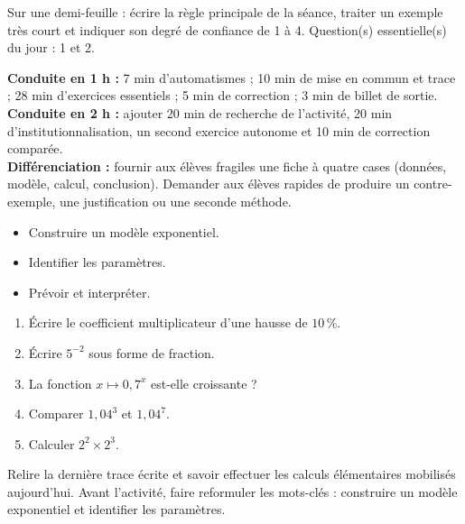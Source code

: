 \begin{sortie}Sur une demi-feuille : écrire la règle principale de la séance, traiter un exemple très court et indiquer son degré de confiance de 1 à 4. Question(s) essentielle(s) du jour : 1 et 2.\end{sortie}

\ifprof
\begin{methode}
\textbf{Conduite en 1 h :} 7 min d'automatismes ; 10 min de mise en commun et trace ; 28 min d'exercices essentiels ; 5 min de correction ; 3 min de billet de sortie.\\
\textbf{Conduite en 2 h :} ajouter 20 min de recherche de l'activité, 20 min d'institutionnalisation, un second exercice autonome et 10 min de correction comparée.\\
\textbf{Différenciation :} fournir aux élèves fragiles une fiche à quatre cases (données, modèle, calcul, conclusion). Demander aux élèves rapides de produire un contre-exemple, une justification ou une seconde méthode.
\end{methode}
\fi
{}
\begin{objectifs}\begin{itemize}\item Construire un modèle exponentiel.\item Identifier les paramètres.\item Prévoir et interpréter.\end{itemize}\end{objectifs}
\begin{automatismes}\begin{enumerate}\item Écrire le coefficient multiplicateur d'une hausse de $10\,\%$. \item Écrire $5^{-2}$ sous forme de fraction. \item La fonction $x\mapsto0{,}7^x$ est-elle croissante ? \item Comparer $1{,}04^3$ et $1{,}04^7$. \item Calculer $2^2\times2^3$. \end{enumerate}\end{automatismes}
\begin{prerequis}Relire la dernière trace écrite et savoir effectuer les calculs élémentaires mobilisés aujourd'hui. Avant l'activité, faire reformuler les mots-clés : construire un modèle exponentiel et identifier les paramètres.\end{prerequis}

